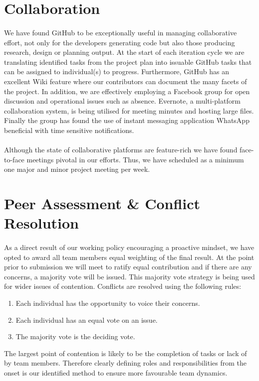 \documentclass[11pt,a4paper]{article}
\begin{document}
\section{Collaboration}
\paragraph{}
We have found GitHub to be exceptionally useful in managing collaborative effort, not only for the developers generating code but also those producing research, design or planning output.  At the start of each iteration cycle we are translating identified tasks from the project plan into issuable GitHub tasks that can be assigned to individual(s) to progress.  Furthermore, GitHub has an excellent Wiki feature where our contributors can document the many facets of the project.
\newline
In addition, we are effectively employing a Facebook group for open discussion and operational issues such as absence.  Evernote, a multi-platform collaboration system, is being utilised for meeting minutes and hosting large files.  Finally the group has found the use of instant messaging application WhatsApp beneficial with time sensitive notifications.
\paragraph{}
Although the state of collaborative platforms are feature-rich we have found face-to-face meetings pivotal in our efforts.  Thus, we have scheduled as a minimum one major and minor project meeting per week.

\section{Peer Assessment \& Conflict Resolution}
\paragraph{}
As a direct result of our working policy encouraging a proactive mindset, we have opted to award all team members equal weighting of the final result.  At the point prior to submission we will meet to ratify equal contribution and if there are any concerns, a majority vote will be issued.
This majority vote strategy is being used for wider issues of contention.  Conflicts are resolved using the following rules:

\begin{enumerate}
  \item Each individual has the opportunity to voice their concerns.
  \item Each individual has an equal vote on an issue.
  \item The majority vote is the deciding vote.
\end{enumerate}

The largest point of contention is likely to be the completion of tasks or lack of by team members.  Therefore clearly defining roles and responsibilities from the onset is our identified method to ensure more favourable team dynamics.
\end{document}
